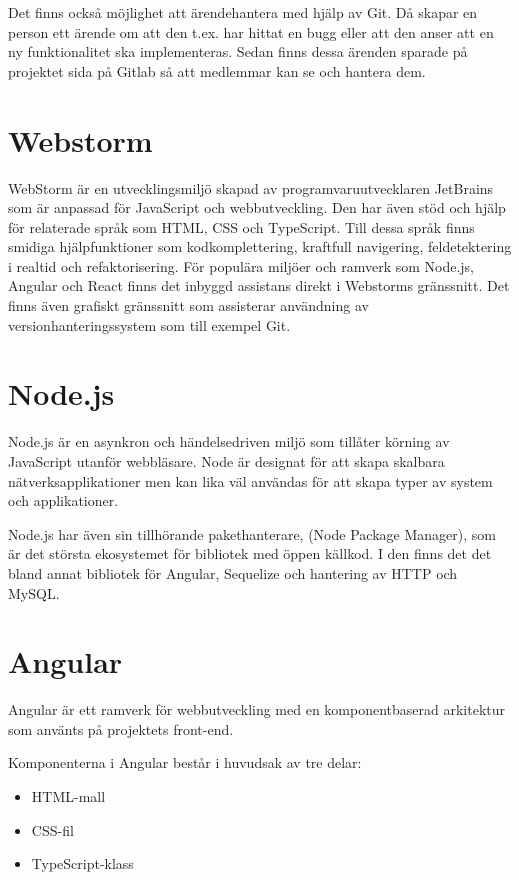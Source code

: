 Det finns också möjlighet att ärendehantera med hjälp av Git.
Då skapar en person ett ärende om att den t.ex. har hittat en bugg eller att den anser att en ny funktionalitet ska implementeras.
Sedan finns dessa ärenden sparade på projektet sida på Gitlab så att medlemmar kan se och hantera dem. \cite{gitlab}

\section{Webstorm}
WebStorm är en utvecklingsmiljö skapad av programvaruutvecklaren JetBrains som är anpassad för JavaScript och webbutveckling. Den har även stöd och hjälp för relaterade språk som HTML, CSS och TypeScript. Till dessa språk finns smidiga hjälpfunktioner som kodkomplettering, kraftfull navigering, feldetektering i realtid och refaktorisering. För populära miljöer och ramverk som Node.js, Angular och React finns det inbyggd assistans direkt i Webstorms gränssnitt. Det finns även grafiskt gränssnitt som assisterar användning av versionhanteringssystem som till exempel Git.\cite{webstorm}
\section{Node.js}
Node.js är en asynkron och händelsedriven miljö som tillåter körning av JavaScript utanför webbläsare. Node är designat för att skapa skalbara nätverksapplikationer men kan lika väl användas för att skapa typer av system och applikationer. \cite{nodejs}

Node.js har även sin tillhörande pakethanterare, (Node Package Manager), som är det största ekosystemet för bibliotek med öppen källkod. \cite{npm}
I den finns det det bland annat bibliotek för Angular, Sequelize och hantering av HTTP och MySQL.

\section{Angular}
Angular är ett ramverk för webbutveckling med en komponentbaserad arkitektur som använts på projektets front-end. 

Komponenterna i Angular består i huvudsak av tre delar:

\begin{itemize} 
\item HTML-mall 
\item CSS-fil
\item TypeScript-klass 
\end{itemize}

